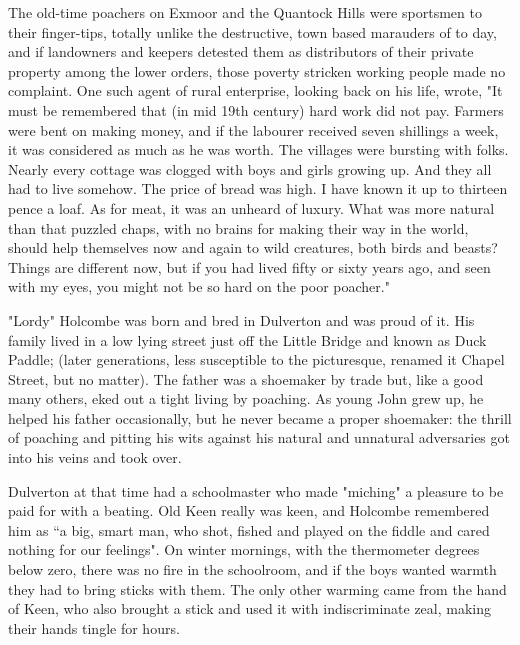 
The old-time poachers on Exmoor and the Quantock Hills were sportsmen to their finger-tips, totally unlike the destructive, town based marauders of to day, and if landowners and keepers detested them as distributors of their private property among the lower orders, those poverty stricken working people made no complaint. One such agent of rural enterprise, looking back on his life, wrote, "It must be remembered that (in mid 19th century) hard work did not pay. Farmers were bent on making money, and if the labourer received seven shillings a week, it was considered as much as he was worth. The villages were bursting with folks. Nearly every cottage was clogged with boys and girls growing up. And they all had to live somehow. The price of bread was high. I have known it up to thirteen pence a loaf. As for meat, it was an unheard of luxury. What was more natural than that puzzled chaps, with no brains for making their way in the world, should help themselves now and again to wild creatures, both birds and beasts? Things are different now, but if you had lived fifty or sixty years ago, and seen with my eyes, you might not be so hard on the poor poacher." 

"Lordy" Holcombe was born and bred in Dulverton and was proud of it. His family lived in a low lying street just off the Little Bridge and known as Duck Paddle; (later generations, less susceptible to the picturesque, renamed it Chapel Street, but no matter). The father was a shoemaker by trade but, like a good many others, eked out a tight living by poaching. As young John grew up, he helped his father occasionally, but he never became a proper shoemaker: the thrill of poaching and pitting his wits against his natural and unnatural adversaries got into his veins and took over.

Dulverton at that time had a schoolmaster who made "miching" a pleasure to be paid for with a beating. Old Keen really was keen, and Holcombe remembered him as “a big, smart man, who shot, fished and played on the fiddle and cared nothing for our feelings". On winter mornings, with the thermometer degrees below zero, there was no fire in the schoolroom, and if the boys wanted warmth they had to bring sticks with them. The only other warming came from the hand of Keen, who also brought a stick and used it with indiscriminate zeal, making their hands tingle for hours.

